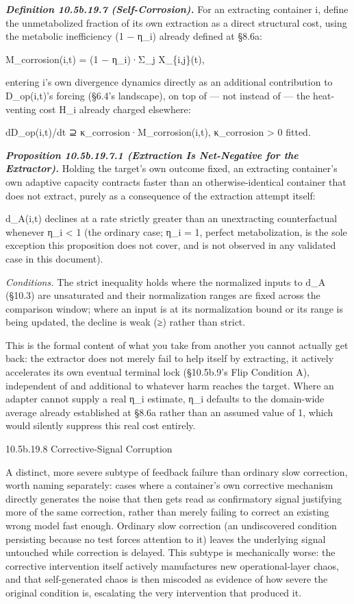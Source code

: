 \documentclass[
]{article}
\begin{document}
\emph{\textbf{Definition 10.5b.19.7 (Self-Corrosion).}} For an
extracting container i, define the unmetabolized fraction of its own
extraction as a direct structural cost, using the metabolic inefficiency
(1 − η\_i) already defined at §8.6a:

M\_corrosion(i,t) = (1 − η\_i)·Σ\_j X\_\{i,j\}(t),

entering i's own divergence dynamics directly as an additional
contribution to D\_op(i,t)'s forcing (§6.4's landscape), on top of ---
not instead of --- the heat-venting cost H\_i already charged elsewhere:

dD\_op(i,t)/dt ⊇ κ\_corrosion·M\_corrosion(i,t), κ\_corrosion
\textgreater{} 0 fitted.

\emph{\textbf{Proposition 10.5b.19.7.1 (Extraction Is Net-Negative for
the Extractor).}} Holding the target's own outcome fixed, an extracting
container's own adaptive capacity contracts faster than an
otherwise-identical container that does not extract, purely as a
consequence of the extraction attempt itself:

d\_A(i,t) declines at a rate strictly greater than an unextracting
counterfactual whenever η\_i \textless{} 1 (the ordinary case; η\_i = 1,
perfect metabolization, is the sole exception this proposition does not
cover, and is not observed in any validated case in this document).

\emph{Conditions.} The strict inequality holds where the normalized
inputs to d\_A (§10.3) are unsaturated and their normalization ranges
are fixed across the comparison window; where an input is at its
normalization bound or its range is being updated, the decline is weak
(≥) rather than strict.

This is the formal content of what you take from another you cannot
actually get back: the extractor does not merely fail to help itself by
extracting, it actively accelerates its own eventual terminal lock
(§10.5b.9's Flip Condition A), independent of and additional to whatever
harm reaches the target. Where an adapter cannot supply a real η\_i
estimate, η\_i defaults to the domain-wide average already established
at §8.6a rather than an assumed value of 1, which would silently
suppress this real cost entirely.

10.5b.19.8 Corrective-Signal Corruption

A distinct, more severe subtype of feedback failure than ordinary slow
correction, worth naming separately: cases where a container's own
corrective mechanism directly generates the noise that then gets read as
confirmatory signal justifying more of the same correction, rather than
merely failing to correct an existing wrong model fast enough. Ordinary
slow correction (an undiscovered condition persisting because no test
forces attention to it) leaves the underlying signal untouched while
correction is delayed. This subtype is mechanically worse: the
corrective intervention itself actively manufactures new
operational-layer chaos, and that self-generated chaos is then miscoded
as evidence of how severe the original condition is, escalating the very
intervention that produced it.
\end{document}
